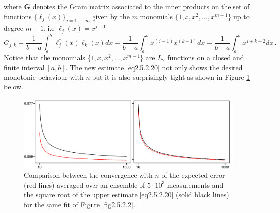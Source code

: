 \documentclass[../main.tex]{subfiles}
\begin{document}
where $\boldsymbol{G}$ denotes the Gram matrix associated to the inner products on the set of functions $\{\ell_{j}(x)\}_{j=1,\dots,m}$ given by the $m$ monomials $\{1,x,x^{2},\dots,x^{m-1}\}$ up to degree $m-1$, i.e $\ell_{j}(x) = x^{j-1}$
\begin{equation*}
     G_{j,k}=\frac{1}{b-a}\int_{a}^{b}\ell_{j}^{*}(x)\ell_{k}(x)dx = \frac{1}{b-a}\int_{a}^{b}x^{(j-1)}x^{(k-1)}dx = \frac{1}{b-a}\int_{a}^{b}x^{j+k-2}dx\,.
\end{equation*}
Notice that the monomials $\{1,x,x^{2},\dots,x^{m-1}\}$ are $L_{2}$ functions on a closed and finite interval $[a,b]$. 
The new estimate \eqref{eq2.5.2.20} not only shows the desired monotonic behaviour with $n$ but it is also surprisingly tight as shown in Figure \ref{fig2.5.2.4} below.
\begin{figure}[H]
    \centering 
    \includegraphics[keepaspectratio, width=\textwidth]{../figures/fig2.5.2.4.png}
    \caption{Comparison between the convergence with $n$ of the expected error (red lines) averaged over an ensemble of $5\cdot10^{3}$ measurements and the square root of the upper estimate \eqref{eq2.5.2.20} (solid black lines) for the same fit of Figure \ref{fig2.5.2.2}.}
    \label{fig2.5.2.4}
\end{figure}
\end{document}

